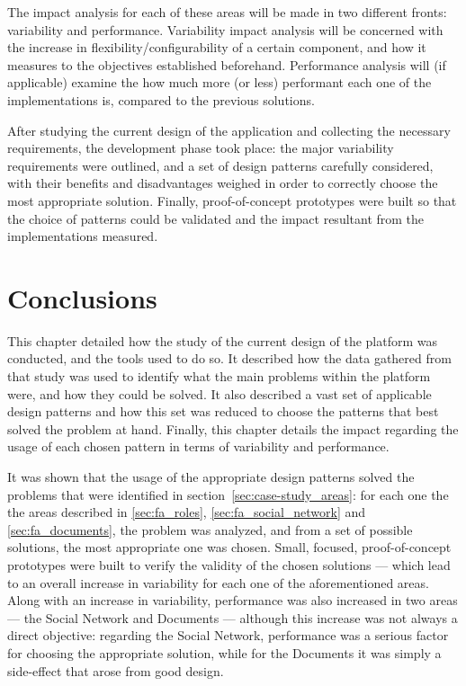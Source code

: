 The impact analysis for each of these areas will be made in two different fronts: variability and performance. Variability impact analysis will be concerned with the increase in flexibility/configurability of a certain component, and how it measures to the objectives established beforehand. Performance analysis will (if applicable) examine the how much more (or less) performant each one of the implementations is, compared to the previous solutions.

After studying the current design of the application and collecting the necessary requirements, the development phase took place: the major variability requirements were outlined, and a set of design patterns carefully considered, with their benefits and disadvantages weighed in order to correctly choose the most appropriate solution. Finally, proof-of-concept prototypes were built so that the choice of patterns could be validated and the impact resultant from the implementations measured.





\section{Conclusions}\label{sec:approach_results_conclusions}

This chapter detailed how the study of the current design of the platform was conducted, and the tools used to do so. It described how the data gathered from that study was used to identify what the main problems within the platform were, and how they could be solved. It also described a vast set of applicable design patterns and how this set was reduced to choose the patterns that best solved the problem at hand. Finally, this chapter details the impact regarding the usage of each chosen pattern in terms of variability and performance.

It was shown that the usage of the appropriate design patterns solved the problems that were identified in section~\ref{sec:case-study_areas}: for each one the the areas described in \ref{sec:fa_roles}, \ref{sec:fa_social_network} and \ref{sec:fa_documents}, the problem was analyzed, and from a set of possible solutions, the most appropriate one was chosen. Small, focused, proof-of-concept prototypes were built to verify the validity of the chosen solutions --- which lead to an overall increase in variability for each one of the aforementioned areas. Along with an increase in variability, performance was also increased in two areas --- the Social Network and Documents --- although this increase was not always a direct objective: regarding the Social Network, performance was a serious factor for choosing the appropriate solution, while for the Documents it was simply a side-effect that arose from good design.


